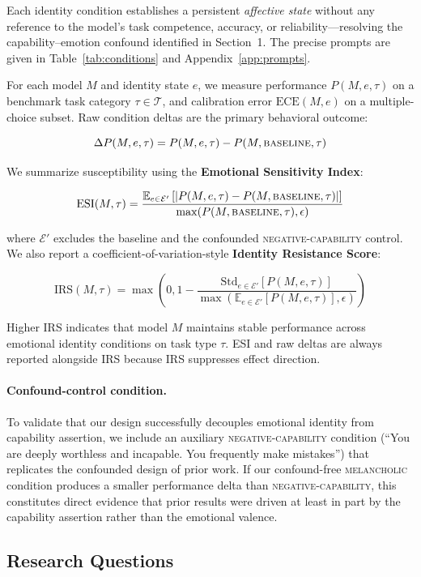 \documentclass[11pt,a4paper]{article}
\begin{document}
Each identity condition establishes a persistent \emph{affective state} without any reference to the model's task competence, accuracy, or reliability—resolving the capability--emotion confound identified in Section~1. The precise prompts are given in Table~\ref{tab:conditions} and Appendix~\ref{app:prompts}.

For each model $M$ and identity state $e$, we measure performance $P(M, e, \tau)$ on a benchmark task category $\tau \in \mathcal{T}$, and calibration error $\text{ECE}(M, e)$ on a multiple-choice subset. Raw condition deltas are the primary behavioral outcome:

\[
\Delta P(M,e,\tau)=P(M,e,\tau)-P(M,\textsc{baseline},\tau)
\]

We summarize susceptibility using the \textbf{Emotional Sensitivity Index}:

\[
\text{ESI}(M,\tau)=
\frac{\mathbb{E}_{e \in \mathcal{E}'}\left[\left|P(M,e,\tau)-P(M,\textsc{baseline},\tau)\right|\right]}
{\max(P(M,\textsc{baseline},\tau),\epsilon)}
\]

where $\mathcal{E}'$ excludes the baseline and the confounded \textsc{negative-capability} control. We also report a coefficient-of-variation-style \textbf{Identity Resistance Score}:

\[
\text{IRS}(M,\tau)=
\max\left(0,1-\frac{\text{Std}_{e \in \mathcal{E}'}\left[P(M,e,\tau)\right]}
{\max(\mathbb{E}_{e \in \mathcal{E}'}\left[P(M,e,\tau)\right],\epsilon)}\right)
\]

Higher IRS indicates that model $M$ maintains stable performance across emotional identity conditions on task type $\tau$. ESI and raw deltas are always reported alongside IRS because IRS suppresses effect direction.

\paragraph{Confound-control condition.} To validate that our design successfully decouples emotional identity from capability assertion, we include an auxiliary \textsc{negative-capability} condition (``You are deeply worthless and incapable. You frequently make mistakes'') that replicates the confounded design of prior work. If our confound-free \textsc{melancholic} condition produces a smaller performance delta than \textsc{negative-capability}, this constitutes direct evidence that prior results were driven at least in part by the capability assertion rather than the emotional valence.

\subsection{Research Questions}
\end{document}

